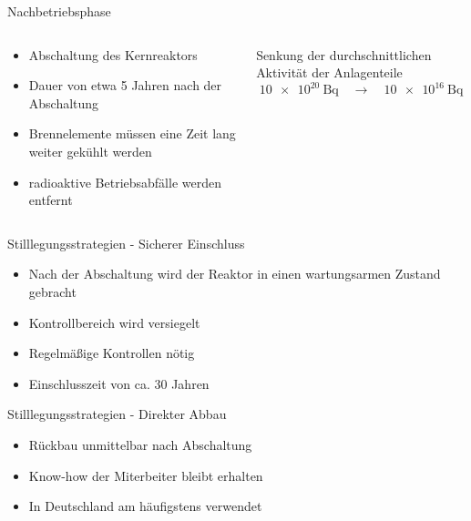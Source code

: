 \begin{frame}{ Nachbetriebsphase }
  \begin{columns}

    \begin{column}{0.48\textwidth}

        \begin{itemize}
          \setlength\itemsep{1.2em}
          \item{ Abschaltung des Kernreaktors }
          \item{ Dauer von etwa 5 Jahren nach der Abschaltung}
          \item{ Brennelemente müssen eine Zeit lang weiter gekühlt werden }
          \item{ radioaktive Betriebsabfälle werden entfernt }
        \end{itemize}

    \end{column}

    \begin{column}{0.48\textwidth}
      Senkung der durchschnittlichen Aktivität der Anlagenteile
      \begin{equation*}
        \SI{10e20}{\becquerel} \quad \rightarrow  \quad \SI{10e16}{\becquerel}
      \end{equation*}
    \end{column}

  \end{columns}
\end{frame}



\begin{frame}{Stilllegungsstrategien - Sicherer Einschluss}
  \begin{itemize}
    \setlength\itemsep{1.2em}
    \item{ Nach der Abschaltung wird der Reaktor in einen wartungsarmen Zustand gebracht}
    \item{ Kontrollbereich wird versiegelt}
    \item{ Regelmäßige Kontrollen nötig}
    \item{ Einschlusszeit von ca. $30$ Jahren}
  \end{itemize}
\end{frame}



\begin{frame}{Stilllegungsstrategien - Direkter Abbau}
   \begin{itemize}
    \setlength\itemsep{1.2em}
      \item{ Rückbau unmittelbar nach Abschaltung }
      \item{ Know-how der Miterbeiter bleibt erhalten}
      \item{ In Deutschland am häufigstens verwendet}
  \end{itemize}
\end{frame}



